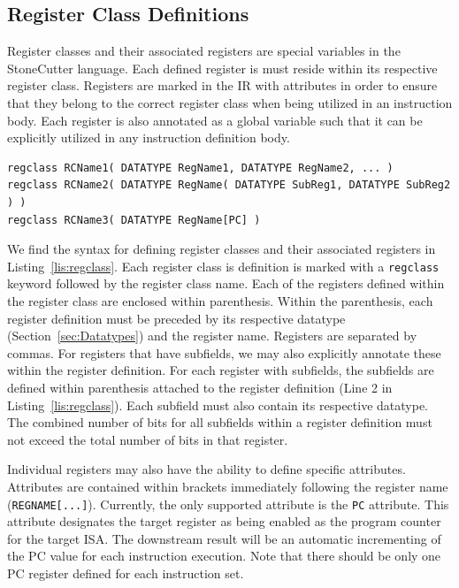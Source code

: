 \documentclass{article}
\begin{document}
\clearpage
\subsection{Register Class Definitions}
\label{sec:RegClassDef}

Register classes and their associated registers are special variables in the StoneCutter language.  Each defined register 
is must reside within its respective register class.  Registers are marked in the IR with attributes in order to ensure that 
they belong to the correct register class when being utilized in an instruction body.  Each register is also annotated as a global 
variable such that it can be explicitly utilized in any instruction definition body.

\vspace{0.125in}
\begin{lstlisting}[frame=single,style=base,caption={Register Class Definition Syntax},captionpos=b,label={lis:regclass}]
regclass RCName1( DATATYPE RegName1, DATATYPE RegName2, ... )
regclass RCName2( DATATYPE RegName( DATATYPE SubReg1, DATATYPE SubReg2 ) )
regclass RCName3( DATATYPE RegName[PC] )
\end{lstlisting}

We find the syntax for defining register classes and their associated registers in Listing~\ref{lis:regclass}.  Each register 
class is definition is marked with a \texttt{regclass} keyword followed by the register class name.  Each of the registers 
defined within the register class are enclosed within parenthesis.  Within the parenthesis, each register definition must 
be preceded by its respective datatype (Section~\ref{sec:Datatypes}) and the register name.  Registers are separated 
by commas.  For registers that have subfields, we may also explicitly annotate these within the register definition.  For 
each register with subfields, the subfields are defined within parenthesis attached to the register definition 
(Line 2 in Listing~\ref{lis:regclass}).  Each subfield must also contain its respective datatype.  The combined number of bits for 
all subfields within a register definition must not exceed the total number of bits in that register.  

Individual registers may also have the ability to define specific attributes.  Attributes are contained within brackets immediately 
following the register name (\texttt{REGNAME[...]}).  Currently, the only supported attribute is the \texttt{PC} attribute.  This attribute 
designates the target register as being enabled as the program counter for the target ISA.  The downstream result will be an automatic 
incrementing of the PC value for each instruction execution.  Note that there should be only one PC register defined for each instruction 
set.    
\end{document}
